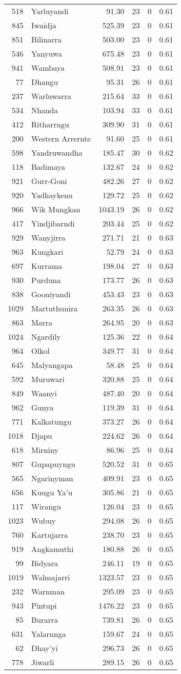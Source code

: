 \begin{longtable}[]{@{}rlrrrr@{}}
518 & Yarluyandi & 91.30 & 23 & 0 & 0.61\tabularnewline
845 & Iwaidja & 525.39 & 23 & 0 & 0.61\tabularnewline
851 & Bilinarra & 503.00 & 23 & 0 & 0.61\tabularnewline
546 & Yanyuwa & 675.48 & 23 & 0 & 0.61\tabularnewline
941 & Wambaya & 508.91 & 23 & 0 & 0.61\tabularnewline
77 & Dhangu & 95.31 & 26 & 0 & 0.61\tabularnewline
237 & Warluwarra & 215.64 & 33 & 0 & 0.61\tabularnewline
534 & Nhanda & 103.94 & 33 & 0 & 0.61\tabularnewline
412 & Ritharrngu & 309.90 & 31 & 0 & 0.61\tabularnewline
200 & Western Arrernte & 91.60 & 25 & 0 & 0.61\tabularnewline
598 & Yandruwandha & 185.47 & 30 & 0 & 0.62\tabularnewline
118 & Badimaya & 132.67 & 24 & 0 & 0.62\tabularnewline
921 & Gurr-Goni & 482.26 & 27 & 0 & 0.62\tabularnewline
920 & Yadhaykenu & 129.72 & 25 & 0 & 0.62\tabularnewline
966 & Wik Mungkan & 1043.19 & 26 & 0 & 0.62\tabularnewline
417 & Yindjibarndi & 203.44 & 25 & 0 & 0.62\tabularnewline
929 & Wanyjirra & 271.71 & 21 & 0 & 0.63\tabularnewline
963 & Kungkari & 52.79 & 24 & 0 & 0.63\tabularnewline
697 & Kurrama & 198.04 & 27 & 0 & 0.63\tabularnewline
930 & Purduna & 173.77 & 26 & 0 & 0.63\tabularnewline
838 & Gooniyandi & 453.43 & 23 & 0 & 0.63\tabularnewline
1029 & Martuthunira & 263.35 & 26 & 0 & 0.63\tabularnewline
863 & Marra & 264.95 & 20 & 0 & 0.63\tabularnewline
1024 & Ngardily & 125.36 & 22 & 0 & 0.64\tabularnewline
964 & Olkol & 349.77 & 31 & 0 & 0.64\tabularnewline
645 & Malyangapa & 58.48 & 25 & 0 & 0.64\tabularnewline
592 & Muruwari & 320.88 & 25 & 0 & 0.64\tabularnewline
849 & Waanyi & 487.40 & 20 & 0 & 0.64\tabularnewline
962 & Gunya & 119.39 & 31 & 0 & 0.64\tabularnewline
771 & Kalkatungu & 373.27 & 26 & 0 & 0.64\tabularnewline
1018 & Djapu & 224.62 & 26 & 0 & 0.64\tabularnewline
618 & Mirniny & 86.96 & 25 & 0 & 0.64\tabularnewline
807 & Gupapuyngu & 520.52 & 31 & 0 & 0.65\tabularnewline
565 & Ngarinyman & 409.91 & 23 & 0 & 0.65\tabularnewline
656 & Kuugu Ya'u & 305.86 & 21 & 0 & 0.65\tabularnewline
117 & Wirangu & 126.04 & 23 & 0 & 0.65\tabularnewline
1023 & Wubuy & 294.08 & 26 & 0 & 0.65\tabularnewline
760 & Kartujarra & 238.70 & 23 & 0 & 0.65\tabularnewline
919 & Angkamuthi & 180.88 & 26 & 0 & 0.65\tabularnewline
99 & Bidyara & 246.11 & 19 & 0 & 0.65\tabularnewline
1019 & Walmajarri & 1323.57 & 23 & 0 & 0.65\tabularnewline
232 & Warnman & 295.09 & 23 & 0 & 0.65\tabularnewline
943 & Pintupi & 1476.22 & 23 & 0 & 0.65\tabularnewline
85 & Burarra & 739.81 & 26 & 0 & 0.65\tabularnewline
631 & Yalarnnga & 159.67 & 24 & 0 & 0.65\tabularnewline
62 & Dhay'yi & 296.73 & 26 & 0 & 0.65\tabularnewline
778 & Jiwarli & 289.15 & 26 & 0 & 0.65\tabularnewline

\end{longtable}
